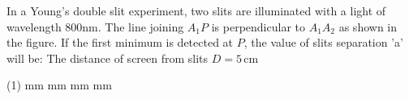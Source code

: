 \item In a Young's double slit experiment, two slits are illuminated with a light of wavelength 800nm. The line joining \( A_1 P \) is perpendicular to \( A_1 A_2 \) as shown in the figure. If the first minimum is detected at \( P \), the value of slits separation 'a' will be:
The distance of screen from slits \( D = 5 \, \text{cm} \)
    \begin{center}
    \end{center}
    \begin{tasks}(1)
         mm
         mm
         mm
         mm
    \end{tasks}